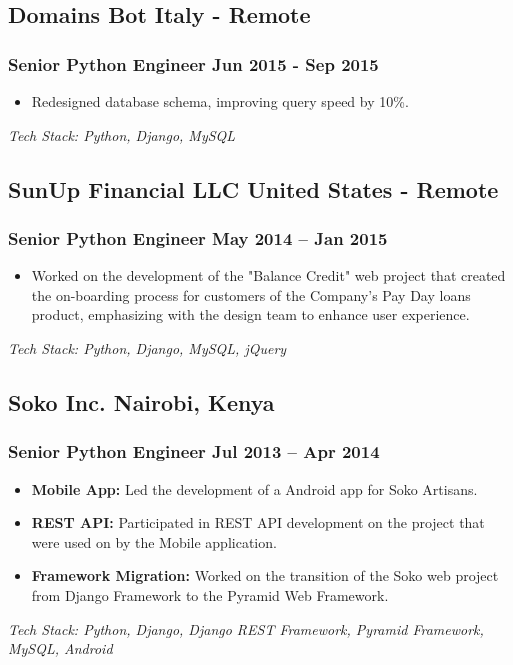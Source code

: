 \documentclass[11pt]{article} %
\newcommand \techstack [1]
    {\small\textit{Tech Stack: {#1}}} %
\begin{document}
\subsection{Domains Bot \hfill Italy - Remote}
\subsubsection{Senior Python Engineer \hfill  Jun 2015 - Sep 2015}
\begin{itemize}
    \item Redesigned database schema, improving query speed by 10\%.
\end{itemize}
\techstack{Python, Django, MySQL}


\subsection{SunUp Financial LLC \hfill United States - Remote}
\subsubsection{Senior Python Engineer \hfill  May 2014 -- Jan 2015}
\begin{itemize}
    \item Worked on the development of the "Balance Credit" web project that created the on-boarding process for customers of the Company's Pay Day loans product, emphasizing with the design team to enhance user experience.
\end{itemize}
\techstack{Python, Django, MySQL, jQuery}


\subsection{Soko Inc. \hfill Nairobi, Kenya}
\subsubsection{Senior Python Engineer \hfill  Jul 2013 -- Apr 2014}
\begin{itemize}
    \item \textbf{Mobile App:} Led the development of a Android app for Soko Artisans.
    \item \textbf{REST API:} Participated in REST API development on the project that were used on by the Mobile application.
    \item \textbf{Framework Migration:} Worked on the transition of the Soko web project from Django Framework to the Pyramid Web Framework.
\end{itemize}
\techstack{Python, Django, Django REST Framework, Pyramid Framework, MySQL, Android}
\end{document}
